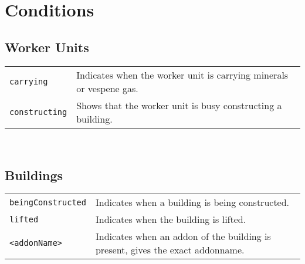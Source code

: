 \section{Conditions}
\label{conditions}

\subsection{Worker Units}
\begin{tabularx}{\textwidth}{lX}
 \verb|carrying| & Indicates when the worker unit is carrying minerals or vespene gas. \\
 \verb|constructing| & Shows that the worker unit is busy constructing a building.
\end{tabularx} \\

\subsection{Buildings}
\begin{tabularx}{\textwidth}{lX}
 \verb|beingConstructed| & Indicates when a building is being constructed. \\
 \verb|lifted| & Indicates when the building is lifted. \\
 \verb|<addonName>| & Indicates when an addon of the building is present, gives the exact addonname.
\end{tabularx} \\

